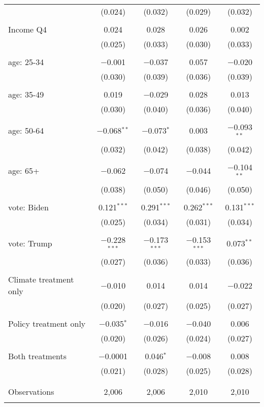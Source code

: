 \begin{tabular}{@{\extracolsep{5pt}}lcccc}
  & (0.024) & (0.032) & (0.029) & (0.032) \\ 
  & & & & \\ 
 Income Q4 & 0.024 & 0.028 & 0.026 & 0.002 \\ 
  & (0.025) & (0.033) & (0.030) & (0.033) \\ 
  & & & & \\ 
 age: 25-34 & $-$0.001 & $-$0.037 & 0.057 & $-$0.020 \\ 
  & (0.030) & (0.039) & (0.036) & (0.039) \\ 
  & & & & \\ 
 age: 35-49 & 0.019 & $-$0.029 & 0.028 & 0.013 \\ 
  & (0.030) & (0.040) & (0.036) & (0.040) \\ 
  & & & & \\ 
 age: 50-64 & $-$0.068$^{**}$ & $-$0.073$^{*}$ & 0.003 & $-$0.093$^{**}$ \\ 
  & (0.032) & (0.042) & (0.038) & (0.042) \\ 
  & & & & \\ 
 age: 65+ & $-$0.062 & $-$0.074 & $-$0.044 & $-$0.104$^{**}$ \\ 
  & (0.038) & (0.050) & (0.046) & (0.050) \\ 
  & & & & \\ 
 vote: Biden & 0.121$^{***}$ & 0.291$^{***}$ & 0.262$^{***}$ & 0.131$^{***}$ \\ 
  & (0.025) & (0.034) & (0.031) & (0.034) \\ 
  & & & & \\ 
 vote: Trump & $-$0.228$^{***}$ & $-$0.173$^{***}$ & $-$0.153$^{***}$ & 0.073$^{**}$ \\ 
  & (0.027) & (0.036) & (0.033) & (0.036) \\ 
  & & & & \\ 
 Climate treatment only & $-$0.010 & 0.014 & 0.014 & $-$0.022 \\ 
  & (0.020) & (0.027) & (0.025) & (0.027) \\ 
  & & & & \\ 
 Policy treatment only & $-$0.035$^{*}$ & $-$0.016 & $-$0.040 & 0.006 \\ 
  & (0.020) & (0.026) & (0.024) & (0.027) \\ 
  & & & & \\ 
 Both treatments & $-$0.0001 & 0.046$^{*}$ & $-$0.008 & 0.008 \\ 
  & (0.021) & (0.028) & (0.025) & (0.028) \\ 
  & & & & \\ 
\hline \\[-1.8ex] 

Observations & 2,006 & 2,006 & 2,010 & 2,010 \\ 
\hline 
\hline \\[-1.8ex] 
\end{tabular} 